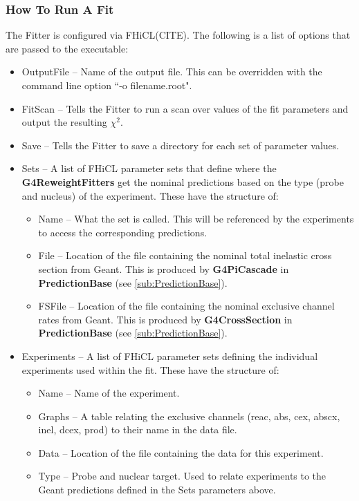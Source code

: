 \documentclass[12pt]{article}
\begin{document}
\subsubsection{How To Run A Fit}\label{sssec:HowToFit}
The Fitter is configured via FHiCL(CITE). The following is a list of options that are passed to the executable:
\begin{itemize}
	\item OutputFile -- Name of the output file. This can be overridden with the command line option ``-o  filename.root".
	\item FitScan -- Tells the Fitter to run a scan over values of the fit parameters and output the resulting $\chi^2$.
	\item Save -- Tells the Fitter to save a directory for each set of parameter values.
	\item Sets -- A list of FHiCL parameter sets that define where the \textbf{G4ReweightFitters} get the nominal predictions based on the type (probe and nucleus) of the experiment. These have the structure of:
	\begin{itemize}
		\item Name -- What the set is called. This will be referenced by the experiments to access the corresponding predictions.
		\item File -- Location of the file containing the nominal total inelastic cross section from Geant. This is produced by \textbf{G4PiCascade} in \textbf{PredictionBase} (see \ref{sub:PredictionBase}). 
		\item FSFile -- Location of the file containing the nominal exclusive channel rates from Geant. This is produced by \textbf{G4CrossSection} in \textbf{PredictionBase} (see \ref{sub:PredictionBase}). 
	\end{itemize}
	\item Experiments -- A list of FHiCL parameter sets defining the individual experiments used within the fit. These have the structure of:
	\begin{itemize}
		\item Name -- Name of the experiment.
		\item Graphs -- A table relating the exclusive channels (reac, abs, cex, abscx, inel, dcex, prod) to their name in the data file.
		\item Data -- Location of the file containing the data for this experiment. 
		\item Type -- Probe and nuclear target. Used to relate experiments to the Geant predictions defined in the Sets parameters above.

\end{itemize}
\end{itemize}
\end{document}
